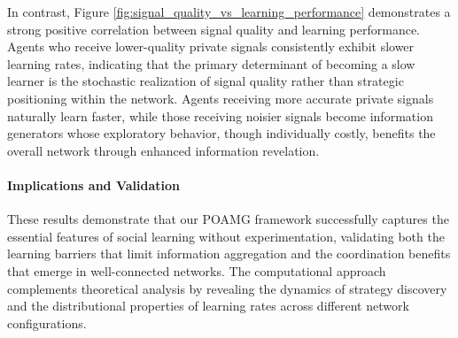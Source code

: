 In contrast, Figure \ref{fig:signal_quality_vs_learning_performance} demonstrates a strong positive correlation between signal quality and learning performance. Agents who receive lower-quality private signals consistently exhibit slower learning rates, indicating that the primary determinant of becoming a slow learner is the stochastic realization of signal quality rather than strategic positioning within the network. Agents receiving more accurate private signals naturally learn faster, while those receiving noisier signals become information generators whose exploratory behavior, though individually costly, benefits the overall network through enhanced information revelation.\fi

\paragraph{Implications and Validation} These results demonstrate that our POAMG framework successfully captures the essential features of social learning without experimentation, validating both the learning barriers that limit information aggregation and the coordination benefits that emerge in well-connected networks. The computational approach complements theoretical analysis by revealing the dynamics of strategy discovery and the distributional properties of learning rates across different network configurations.

